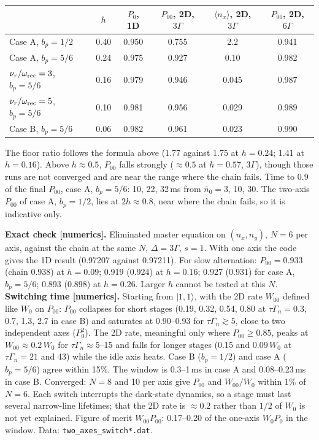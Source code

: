 \documentclass[11pt,a4paper]{article}
\newcommand{\ket}[1]{|#1\rangle}
\begin{document}
\begin{center}\small
\begin{tabular}{lccccc}
\toprule
 & $h$ & $P_0$, 1D & $P_{00}$, 2D, $3\Gamma$ & $\langle n_x\rangle$, 2D, $3\Gamma$ & $P_{00}$, 2D, $6\Gamma$\\
\midrule
Case A, $b_p=1/2$ & 0.40 & 0.950 & 0.755 & 2.2 & 0.941\\
Case A, $b_p=5/6$ & 0.24 & 0.975 & 0.927 & 0.10 & 0.982\\
$\nu_r/\omega_{\rm rec}=3$, $b_p=5/6$ & 0.16 & 0.979 & 0.946 & 0.045 & 0.987\\
$\nu_r/\omega_{\rm rec}=5$, $b_p=5/6$ & 0.10 & 0.981 & 0.956 & 0.029 & 0.989\\
Case B, $b_p=5/6$ & 0.06 & 0.982 & 0.961 & 0.023 & 0.990\\
\bottomrule
\end{tabular}
\end{center}

The floor ratio follows the formula above (1.77 against 1.75 at $h=0.24$; 1.41 at $h=0.16$). Above $h\approx0.5$, $P_{00}$ falls strongly ($\approx0.5$ at $h=0.57$, $3\Gamma$), though those runs are not converged and are near the range where the chain fails. Time to $0.9$ of the final $P_{00}$, case A, $b_p=5/6$: 10, 22, 32\,ms from $\bar n_0=3$, 10, 30. The two-axis $P_{00}$ of case A, $b_p=1/2$, lies at $2h\approx0.8$, near where the chain fails, so it is indicative only.

\textbf{Exact check [numerics].} Eliminated master equation on $(n_x,n_y)$, $N=6$ per axis, against the chain at the same $N$, $\Delta=3\Gamma$, $s=1$. With one axis the code gives the 1D result (0.97207 against 0.97211). For slow alternation: $P_{00}=0.933$ (chain 0.938) at $h=0.09$; 0.919 (0.924) at $h=0.16$; 0.927 (0.931) for case A, $b_p=5/6$; 0.893 (0.898) at $h=0.26$. Larger $h$ cannot be tested at this $N$. \textbf{Switching time [numerics].} Starting from $\ket{1,1}$, with the 2D rate $W_{00}$ defined like $W_0$ on $P_{00}$: $P_{00}$ collapses for short stages (0.19, 0.32, 0.54, 0.80 at $\tau\Gamma_n=0.3$, 0.7, 1.3, 2.7 in case B) and saturates at 0.90--0.93 for $\tau\Gamma_n\gtrsim5$, close to two independent axes ($P_0^2$). The 2D rate, meaningful only where $P_{00}\ge0.85$, peaks at $W_{00}\approx0.2\,W_0$ for $\tau\Gamma_n\approx5$--15 and falls for longer stages (0.15 and $0.09\,W_0$ at $\tau\Gamma_n=21$ and 43) while the idle axis heats. Case B ($b_p=1/2$) and case A ($b_p=5/6$) agree within 15\%. The window is 0.3--1\,ms in case A and 0.08--0.23\,ms in case B. Converged: $N=8$ and 10 per axis give $P_{00}$ and $W_{00}/W_0$ within 1\% of $N=6$. Each switch interrupts the dark-state dynamics, so a stage must last several narrow-line lifetimes; that the 2D rate is $\approx0.2$ rather than $1/2$ of $W_0$ is not yet explained. Figure of merit $W_{00}P_{00}$: 0.17--0.20 of the one-axis $W_0P_0$ in the window. Data: \texttt{two\_axes\_switch*.dat}.
\end{document}
